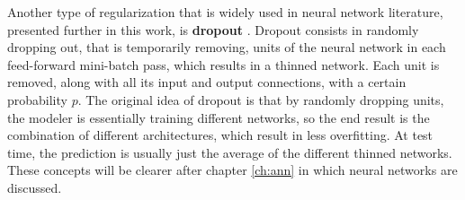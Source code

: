 Another type of regularization that is widely used in neural network literature, presented further in this work, is \textbf{dropout} \cite{srivastava2014dropout}. Dropout consists in randomly dropping out, that is temporarily removing, units of the neural network in each feed-forward mini-batch pass, which results in a thinned network. Each unit is removed, along with all its input and output connections, with a certain probability $p$. The original idea of dropout is that by randomly dropping units, the modeler is essentially training different networks, so the end result is the combination of different architectures, which result in less overfitting. At test time, the prediction is usually just the average of the different thinned networks. These concepts will be clearer after chapter \ref{ch:ann} in which neural networks are discussed.
